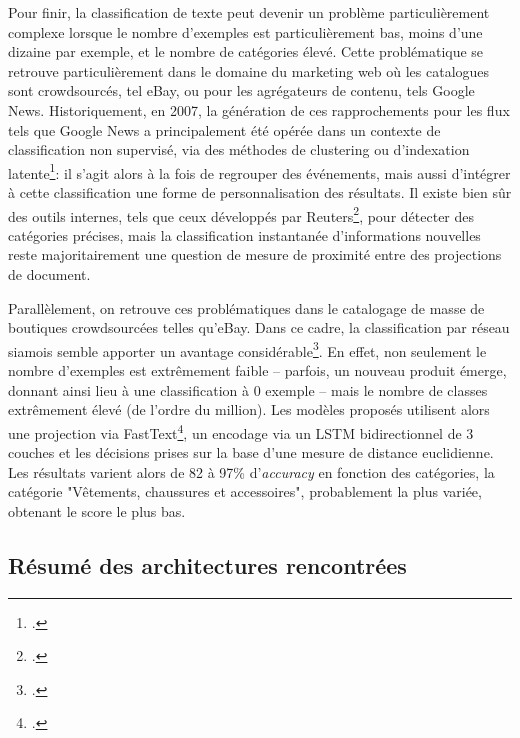 Pour finir, la classification de texte peut devenir un problème particulièrement complexe lorsque le nombre d'exemples est particulièrement bas, moins d'une dizaine par exemple, et le nombre de catégories élevé. Cette problématique se retrouve particulièrement dans le domaine du marketing web où les catalogues sont crowdsourcés, tel eBay, ou pour les agrégateurs de contenu, tels Google News. Historiquement, en 2007, la génération de ces rapprochements pour les flux tels que Google News a principalement été opérée dans un contexte de classification non supervisé, via des méthodes de clustering ou d'indexation latente\footcite{das_google_2007}: il s'agit alors à la fois de regrouper des événements, mais aussi d'intégrer à cette classification une forme de personnalisation des résultats. Il existe bien sûr des outils internes, tels que ceux développés par Reuters\footcite{nugent_comparison_2017}, pour détecter des catégories précises, mais la classification instantanée d'informations nouvelles reste majoritairement une question de mesure de proximité entre des projections de document. 

Parallèlement, on retrouve ces problématiques dans le catalogage de masse de boutiques crowdsourcées telles qu'eBay. Dans ce cadre, la classification par réseau siamois semble apporter un avantage considérable\footcite{shah_neural_2018}. En effet, non seulement le nombre d'exemples est extrêmement faible  -- parfois, un nouveau produit émerge, donnant ainsi lieu à une classification à 0 exemple -- mais le nombre de classes extrêmement élevé (de l'ordre du million). Les modèles proposés utilisent alors une projection via FastText\footcite{fasttext}, un encodage via un LSTM bidirectionnel de 3 couches et les décisions prises sur la base d'une mesure de distance euclidienne. Les résultats varient alors de 82 à 97\% d'\textit{accuracy} en fonction des catégories, la catégorie "Vêtements, chaussures et accessoires", probablement la plus variée, obtenant le score le plus bas.

\subsection{Résumé des architectures rencontrées}

